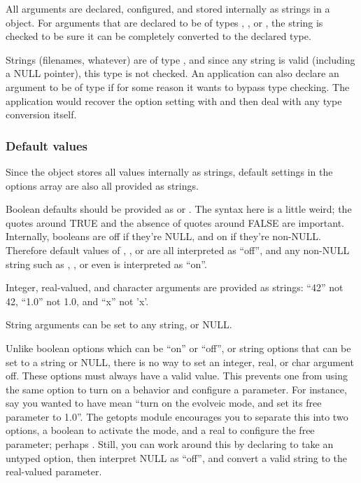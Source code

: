 All arguments are declared, configured, and stored internally as
strings in a  object. For arguments that are
declared to be of types , , or
, the string is checked to be sure it can be
completely converted to the declared type.

Strings (filenames, whatever) are of type , and
since any string is valid (including a NULL pointer), this type is not
checked. An application can also declare an argument to be of type
 if for some reason it wants to bypass type
checking. The application would recover the option setting with
 and then deal with any type
conversion itself.

   \subsubsection{Default values}

Since the  object stores all values internally as
strings, default settings in the options array are also all provided
as strings.

Boolean defaults should be provided as  or
.  The syntax here is a little weird; the quotes
around TRUE and the absence of quotes around FALSE are
important. Internally, booleans are off if they're NULL, and on if
they're non-NULL. Therefore default values of ,
, or  are all interpreted as ``off'', and any
non-NULL string such as , , or even
 is interpreted as ``on''.

Integer, real-valued, and character arguments are provided as strings:
``42'' not 42, ``1.0'' not 1.0, and ``x'' not 'x'. 

String arguments can be set to any string, or NULL. 

Unlike boolean options which can be ``on'' or ``off'', or string
options that can be set to a string or NULL, there is no way to set an
integer, real, or char argument off. These options must always have a
valid value. This prevents one from using the same option to turn on a
behavior and configure a parameter. For instance, say you wanted to
have  mean ``turn on the evolveic mode,
and set its free parameter to 1.0''. The getopts module encourages you
to separate this into two options, a boolean to activate the mode, and
a real to configure the free parameter; perhaps . Still, you can work around this by
declaring  to take an untyped 
option, then interpret NULL as ``off'', and convert a valid string to
the real-valued parameter.
   

